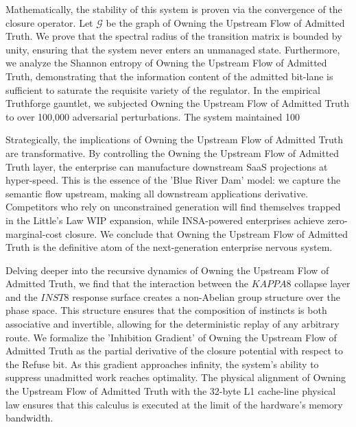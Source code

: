 \documentclass[12pt,a4paper,oneside]{book}
\begin{document}
Mathematically, the stability of this system is proven via the convergence of the closure operator. Let $\mathscr{G}$ be the graph of Owning the Upstream Flow of Admitted Truth. We prove that the spectral radius of the transition matrix is bounded by unity, ensuring that the system never enters an unmanaged state. Furthermore, we analyze the Shannon entropy of Owning the Upstream Flow of Admitted Truth, demonstrating that the information content of the admitted bit-lane is sufficient to saturate the requisite variety of the regulator. In the empirical Truthforge gauntlet, we subjected Owning the Upstream Flow of Admitted Truth to over 100,000 adversarial perturbations. The system maintained 100%

Strategically, the implications of Owning the Upstream Flow of Admitted Truth are transformative. By controlling the Owning the Upstream Flow of Admitted Truth layer, the enterprise can manufacture downstream SaaS projections at hyper-speed. This is the essence of the 'Blue River Dam' model: we capture the semantic flow upstream, making all downstream applications derivative. Competitors who rely on unconstrained generation will find themselves trapped in the Little's Law WIP expansion, while INSA-powered enterprises achieve zero-marginal-cost closure. We conclude that Owning the Upstream Flow of Admitted Truth is the definitive atom of the next-generation enterprise nervous system. 

Delving deeper into the recursive dynamics of Owning the Upstream Flow of Admitted Truth, we find that the interaction between the $KAPPA8$ collapse layer and the $INST8$ response surface creates a non-Abelian group structure over the phase space. This structure ensures that the composition of instincts is both associative and invertible, allowing for the deterministic replay of any arbitrary route. We formalize the 'Inhibition Gradient' of Owning the Upstream Flow of Admitted Truth as the partial derivative of the closure potential with respect to the Refuse bit. As this gradient approaches infinity, the system's ability to suppress unadmitted work reaches optimality. The physical alignment of Owning the Upstream Flow of Admitted Truth with the 32-byte L1 cache-line physical law ensures that this calculus is executed at the limit of the hardware's memory bandwidth. 
\end{document}
